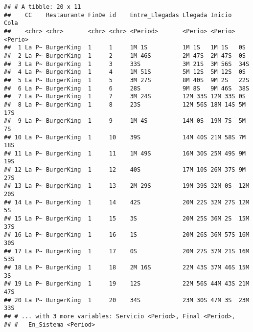 \documentclass[]{article}
\begin{document}
\begin{verbatim}
## # A tibble: 20 x 11
##    CC    Restaurante FinDe id    Entre_Llegadas Llegada Inicio  Cola   
##    <chr> <chr>       <chr> <chr> <Period>       <Perio> <Perio> <Perio>
##  1 La P~ BurgerKing  1     1     1M 1S          1M 1S   1M 1S   0S     
##  2 La P~ BurgerKing  1     2     1M 46S         2M 47S  2M 47S  0S     
##  3 La P~ BurgerKing  1     3     33S            3M 21S  3M 56S  34S    
##  4 La P~ BurgerKing  1     4     1M 51S         5M 12S  5M 12S  0S     
##  5 La P~ BurgerKing  1     5     3M 27S         8M 40S  9M 2S   22S    
##  6 La P~ BurgerKing  1     6     28S            9M 8S   9M 46S  38S    
##  7 La P~ BurgerKing  1     7     3M 24S         12M 33S 12M 33S 0S     
##  8 La P~ BurgerKing  1     8     23S            12M 56S 18M 14S 5M 17S 
##  9 La P~ BurgerKing  1     9     1M 4S          14M 0S  19M 7S  5M 7S  
## 10 La P~ BurgerKing  1     10    39S            14M 40S 21M 58S 7M 18S 
## 11 La P~ BurgerKing  1     11    1M 49S         16M 30S 25M 49S 9M 19S 
## 12 La P~ BurgerKing  1     12    40S            17M 10S 26M 37S 9M 27S 
## 13 La P~ BurgerKing  1     13    2M 29S         19M 39S 32M 0S  12M 20S
## 14 La P~ BurgerKing  1     14    42S            20M 22S 32M 27S 12M 5S 
## 15 La P~ BurgerKing  1     15    3S             20M 25S 36M 2S  15M 37S
## 16 La P~ BurgerKing  1     16    1S             20M 26S 36M 57S 16M 30S
## 17 La P~ BurgerKing  1     17    0S             20M 27S 37M 21S 16M 53S
## 18 La P~ BurgerKing  1     18    2M 16S         22M 43S 37M 46S 15M 3S 
## 19 La P~ BurgerKing  1     19    12S            22M 56S 44M 43S 21M 47S
## 20 La P~ BurgerKing  1     20    34S            23M 30S 47M 3S  23M 33S
## # ... with 3 more variables: Servicio <Period>, Final <Period>,
## #   En_Sistema <Period>
\end{verbatim}
\end{document}
